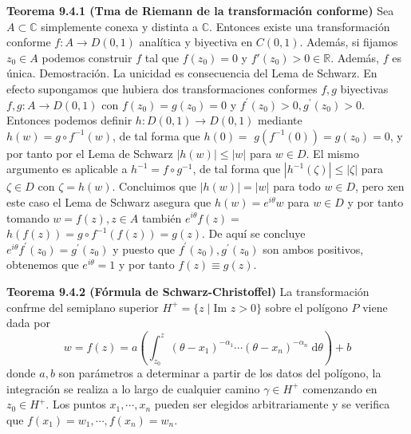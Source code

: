 \documentclass[a4paper, 11pt]{extarticle}
\newcommand{\tma}[1]{\textcolor{rojo}{\textbf{Teorema #1}}}
\newcommand{\dem}[1]{\textcolor{gris}{\small{Demostración. #1}}}
\begin{document}
\begin{multicols*}{2}
\tma{9.4.1 (Tma de Riemann de la transformación conforme)} Sea \(A \subset
\mathbb{C}\) simplemente conexa y distinta a \(\mathbb{C}\). Entonces 
existe una transformación conforme \(f: A \rightarrow  D(0,1)\) analítica 
y biyectiva en \(C(0,1)\). Además, si fijamos \(z_0 \in A\) podemos
construir \(f\) tal que \(f(z_0) = 0\) y \(f'(z_0) > 0 \in \mathbb{R}\).
Además, \(f\) es única.
\dem{ La unicidad es consecuencia del Lema de Schwarz. En efecto supongamos que 
hubiera dos transformaciones conformes $f, g$ biyectivas $f, g: A \rightarrow D(0,1)$ con 
$f\left(z_{0}\right)=g\left(z_{0}\right)=0$ y $f^{\prime}\left(z_{0}\right)>0, g^{\prime}\left(z_{0}\right)>0$. Entonces podemos definir
$h: D(0,1) \rightarrow D(0,1)$ mediante $h(w)=g \circ f^{-1}(w)$, de tal forma que 
$h(0)=$ $g\left(f^{-1}(0)\right)=g\left(z_{0}\right)=0$, y por tanto por el Lema de Schwarz 
$|h(w)| \leq|w|$ para $w \in D$. El mismo argumento es aplicable a $h^{-1}=f \circ g^{-1}$, 
de tal forma que $\left|h^{-1}(\zeta)\right| \leq|\zeta|$ para $\zeta \in D$ con $\zeta=h(w)$. 
Concluimos que $|h(w)|=|w|$ para todo $w \in D$, pero xen este caso el 
Lema de Schwarz asegura que $h(w)=e^{i \theta} w$ para $w \in D$ y por tanto tomando 
$w=f(z), z \in A$ también $e^{i \theta} f(z)=$ $h(f(z))=g \circ f^{-1}(f(z))=g(z)$. 
De aquí se concluye $e^{i \theta} f^{\prime}\left(z_{0}\right)=g^{\prime}\left(z_{0}\right)$ y
puesto que $f^{\prime}\left(z_{0}\right), g^{\prime}\left(z_{0}\right)$ son ambos positivos, obtenemos que 
$e^{i \theta}=1$ y por tanto $f(z) \equiv g(z)$.  }


\tma{9.4.2 (Fórmula de Schwarz-Christoffel)} La transformación confrme del
semiplano superior \(H^+ = \{ z \;|\; \text{Im }z>0 \}\) sobre el polígono
\(P\) viene dada por 
\[ w = f(z) = a \left( \int _{z_0}^z (\theta - x_1)^{-\alpha_1} \cdots 
(\theta - x_n)^{-\alpha_n}  \; \text{d}\theta  \right)  + b \]
donde \(a,b\) son parámetros a determinar a partir de los datos del polígono,
la integración se realiza a lo largo de cualquier camino \(\gamma \in H^+\)
comenzando en \(z_0 \in H^+\). Los puntos \(x_1, \cdots, x_n\) pueden ser
elegidos arbitrariamente y se verifica que \(f(x_1) = w_1, \cdots, f(x_n) = w_n\).


\end{multicols*}
\pagebreak
\end{document}
